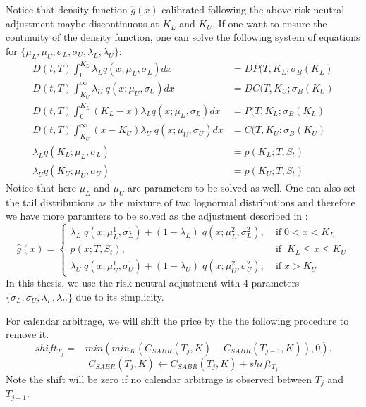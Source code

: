 \documentclass[letterpaper,12pt,titlepage,oneside,final]{book}
\numberwithin{equation}{section}
\theoremstyle{definition}
\begin{document}
Notice that density function $\hat{g}(x)$ calibrated following the above risk neutral adjustment maybe discontinuous at $K_L$ and $K_U$. 
If one want to ensure the continuity of the density function,  one can solve the following system of equations for  $\{\mu_{L}, \mu_{U},\sigma_{L},\sigma_{U}, \lambda_{L}, \lambda_{U}\}$:
\begin{equation}
	\begin{split}
		D(t,T)\int_{0}^{K_{L}}	\lambda_{L}   q(x;\mu_{L},\sigma_{L}) dx&=DP(T,K_{L};\sigma_{B}(K_{L})\\
		D(t,T)\int_{K_{U}}^{\infty}	 \lambda_{U} \;  q(x;\mu_{U},\sigma_{U}) dx&=DC(T,K_{U};\sigma_{B}(K_{U})\\
		D(t,T)\int_{0}^{K_{L}} (K_L-x)	\lambda_{L}   q(x;\mu_{L},\sigma_{L}) dx&=P(T,K_{L};\sigma_{B}(K_{L})\\
		D(t,T)\int_{K_{U}}^{\infty}	(x-K_U) \lambda_{U} \;  q(x;\mu_{U},\sigma_{U}) dx&=C(T,K_{U};\sigma_{B}(K_{U})\\
\lambda_{L} q(K_{L};\mu_{L},\sigma_{L})&=p(K_{L};T,S_t)\\
\lambda_{U} q(K_{U};\mu_{U},\sigma_{U})&=p(K_{U};T,
	S_t)
	\end{split}
\end{equation}
Notice that here $\mu_{L}$ and $\mu_{U}$ are parameters to be solved as well. One can  also set the tail distributions as the mixture of two lognormal distributions and therefore we have  more paramters to be solved as the adjustment described in \cite{brunner2003arbitrage}:
\[
\hat{g}(x)=\left\{ \begin{array}{ll }
\lambda_{L} \;  q(x;\mu^1_{L},\sigma^1_{L})+(1-\lambda_{L}) \;  q(x;\mu^2_{L},\sigma^2_{L}), \;&  \text{if} \; 0<x< K_{L}\\
p(x;T,S_t) , \;&  \text{if} \; \;  K_{L} \leq x \leq K_{U}\\
\lambda_{U} \;  q(x;\mu^1_{U},\sigma^1_{U})+(1-\lambda_{U}) \;  q(x;\mu^2_{U},\sigma^2_{U}), \;& \text{if} \; x> K_{U}
\end{array} \right.
\]
In this thesis, we  use the  risk neutral adjustment with 4 parameters  $\{\sigma_{L},\sigma_{U}, \lambda_{L}, \lambda_{U}\}$ due to its simplicity.





For calendar arbitrage, we will shift the price by the the following procedure to remove it.
\[
shift_{T_j}=-min(min_{K}(C_{SABR}(T_j,K)-C_{SABR}(T_{j-1},K)),0).	
\]
\[
	C_{SABR}(T_j,K) \leftarrow C_{SABR}(T_j,K)+shift_{T_j}
\]
 Note the shift will be zero if no calendar arbitrage is observed between $T_{j}$ and $T_{j-1}$.
\end{document}

